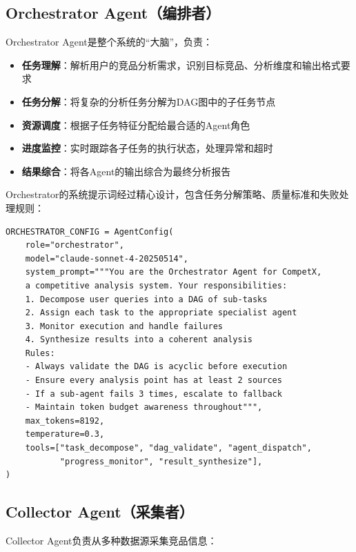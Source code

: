 \documentclass[12pt,a4paper]{ctexrep}
\begin{document}
\subsection{Orchestrator Agent（编排者）}

Orchestrator Agent是整个系统的``大脑''，负责：

\begin{itemize}[leftmargin=2em]
\item \textbf{任务理解}：解析用户的竞品分析需求，识别目标竞品、分析维度和输出格式要求
\item \textbf{任务分解}：将复杂的分析任务分解为DAG图中的子任务节点
\item \textbf{资源调度}：根据子任务特征分配给最合适的Agent角色
\item \textbf{进度监控}：实时跟踪各子任务的执行状态，处理异常和超时
\item \textbf{结果综合}：将各Agent的输出综合为最终分析报告
\end{itemize}

Orchestrator的系统提示词经过精心设计，包含任务分解策略、质量标准和失败处理规则：

\begin{lstlisting}[language=Python3,caption=Orchestrator Agent核心配置,label=lst:orchestrator]
ORCHESTRATOR_CONFIG = AgentConfig(
    role="orchestrator",
    model="claude-sonnet-4-20250514",
    system_prompt="""You are the Orchestrator Agent for CompetX,
    a competitive analysis system. Your responsibilities:
    1. Decompose user queries into a DAG of sub-tasks
    2. Assign each task to the appropriate specialist agent
    3. Monitor execution and handle failures
    4. Synthesize results into a coherent analysis
    Rules:
    - Always validate the DAG is acyclic before execution
    - Ensure every analysis point has at least 2 sources
    - If a sub-agent fails 3 times, escalate to fallback
    - Maintain token budget awareness throughout""",
    max_tokens=8192,
    temperature=0.3,
    tools=["task_decompose", "dag_validate", "agent_dispatch",
           "progress_monitor", "result_synthesize"],
)
\end{lstlisting}

\subsection{Collector Agent（采集者）}

Collector Agent负责从多种数据源采集竞品信息：
\end{document}
